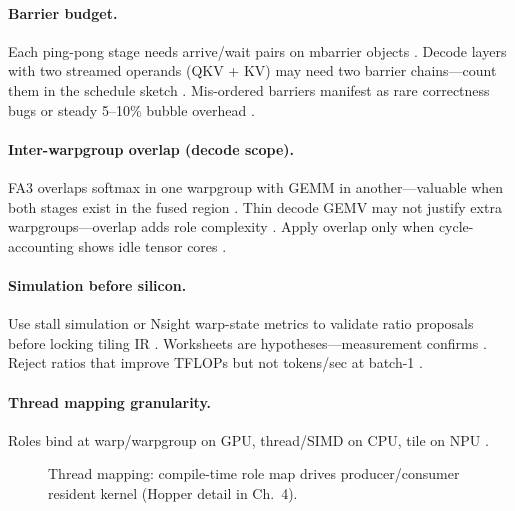 \paragraph{Barrier budget.}
Each ping-pong stage needs arrive/wait pairs on mbarrier objects \citep{semianalysis2024tma,nvidia2022hopper}.
Decode layers with two streamed operands (QKV + KV) may need two barrier chains---count them in the schedule sketch \citep{shah2024flashattention3,yirage2026}.
Mis-ordered barriers manifest as rare correctness bugs or steady 5--10\% bubble overhead \citep{patel2025llminference,taxbreak2026}.

\paragraph{Inter-warpgroup overlap (decode scope).}
FA3 overlaps softmax in one warpgroup with GEMM in another---valuable when both stages exist in the fused region \citep{shah2024flashattention3}.
Thin decode GEMV may not justify extra warpgroups---overlap adds role complexity \citep{patel2025llminference,memoryfloor2026}.
Apply overlap only when cycle-accounting shows idle tensor cores \citep{shah2024flashattention3,yirage2026}.

\paragraph{Simulation before silicon.}
Use stall simulation or Nsight warp-state metrics to validate ratio proposals before locking tiling IR \citep{patel2025llminference,shah2024flashattention3,yirage2026}.
Worksheets are hypotheses---measurement confirms \citep{taxbreak2026,memoryfloor2026,chen2020compilerbasedhardw}.
Reject ratios that improve TFLOPs but not tokens/sec at batch-1 \citep{kwon2023vllm,patel2025llminference}.

\paragraph{Thread mapping granularity.}
Roles bind at warp/warpgroup on GPU, thread/SIMD on CPU, tile on NPU \citep{shah2024flashattention3,amd2024aie,dlbook}.
\begin{figure}[t]
\centering
{}
\caption{Thread mapping: compile-time role map drives producer/consumer resident kernel (Hopper detail in Ch.~4).}
\label{fig:thread_mapping_architecture}
\end{figure}

